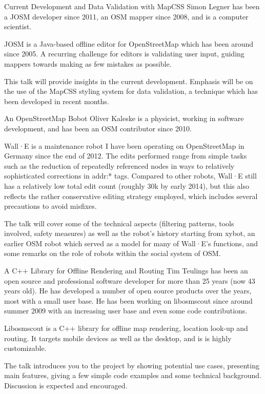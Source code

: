 %
{Current Development and Data Validation with MapCSS}%
{Simon Legner has been a JOSM developer since 2011, an OSM mapper since 2008, and is a computer scientist.}%
{JOSM is a Java-based offline editor for OpenStreetMap which has been around since 2005. A recurring challenge for editors is validating user input, guiding mappers towards making as few mistakes as possible.

This talk will provide insights in the current development. Emphasis will be on the use of the MapCSS styling system for data validation, a technique which has been developed in recent months.}

%
{An OpenStreetMap Bobot}%
{Oliver Kaleske is a physicist, working in software development, and has been an OSM contributor since 2010.}%
{Wall·E is a maintenance robot I have been operating on OpenStreetMap in Germany since the end of 2012. The edits performed range from simple tasks such as the reduction of repeatedly referenced nodes in
ways to relatively sophisticated corrections in addr:* tags. Compared to other robots, Wall·E still has a relatively low total edit count (roughly 30k by early 2014), but this also
reflects the rather conservative editing strategy employed, which includes several precautions to avoid misfixes.

The talk will cover some of the technical aspects (filtering patterns, tools involved, safety measures) as well as the robot's history starting from xybot, an earlier OSM robot which served as
a model for many of Wall·E's functions, and some remarks on the role of robots within the social system of OSM.}

%
{A C++ Library for Offline Rendering and Routing}%
{Tim Teulings has been an open source and professional software developer for more than 25 years (now 43 years old). He has developed a number of open source products over the years, most with a small user base. He has been working on libosmscout since around summer 2009 with an increasing user base and even some code contributions.}%
{Libosmscout is a C++ library for offline map rendering, location look-up and routing. It targets mobile devices as well as the desktop, and is is highly customizable.

The talk introduces you to the project by showing potential use cases, presenting main features, giving a few simple code examples and some technical background. Discussion is expected and encouraged.}


